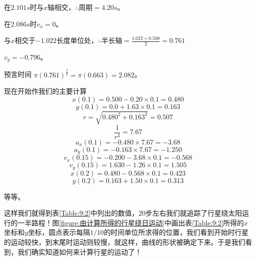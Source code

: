 \begin{small}
    \scriptsize
    在$2.101s$时与$x$轴相交，$\therefore$周期$=4.20s$。
\vspace{-2pt}

    在$2.086s$时$v_x=0$。
\vspace{-2pt}

    与$x$相交于$-1.022$长度单位处，$\therefore$半长轴$=\frac{1.022+0.500}{2}=0.761$
\vspace{-2pt}

    $v_y=-0.796$。
\vspace{-5pt}

    预言时间 $\pi(0.761)^{\frac{3}{2}}=\pi(0.663)=2.082$。
\end{small}

\noindent 现在开始作我们的主要计算
\begin{equation*}
    x(0.1)=0.500 - 0.20 \times 0.1 = 0.480
\end{equation*}
\begin{equation*}
    y(0.1)=0.0 + 1.63 \times 0.1 = 0.163
\end{equation*}
\begin{equation*}
    r=\sqrt{0.480^2+0.163^2}=0.507
\end{equation*}
\begin{equation*}
    \frac{1}{r^3}=7.67
\end{equation*}
\begin{equation*}
    a_x(0.1)=-0.480 \times 7.67 = -3.68
\end{equation*}
\begin{equation*}
    a_y(0.1)=-0.163 \times 7.67 = -1.250
\end{equation*}
\begin{equation*}
    v_x(0.15)=-0.200-3.68 \times 0.1 = -0.568
\end{equation*}
\begin{equation*}
    v_y(0.15)=1.630 - 1.26 \times 0.1 = 1.505
\end{equation*}
\begin{equation*}
    x(0.2) = 0.480 - 0.568 \times 0.1 = 0.423
\end{equation*}
\begin{equation*}
    y(0.2) = 0.163 + 1.50 \times 0.1 = 0.313
\end{equation*}
\centerline{等等。}
这样我们就得到表\ref{Table:9:2}中列出的数值，20步左右我们就追踪了行星绕太阳运行的一半路程！图\ref{figure:由计算所得的行星绕日运动}中画出表\ref{Table:9:2}所得的$x$坐标和$y$坐标，圆点表示每隔$1/10$的时间单位所求得的位置，我们看到开始时行星的运动较快，到末尾时运动则较慢，就这样，曲线的形状被确定下来。于是我们看到，我们确实知道如何来计算行星的运动了！

